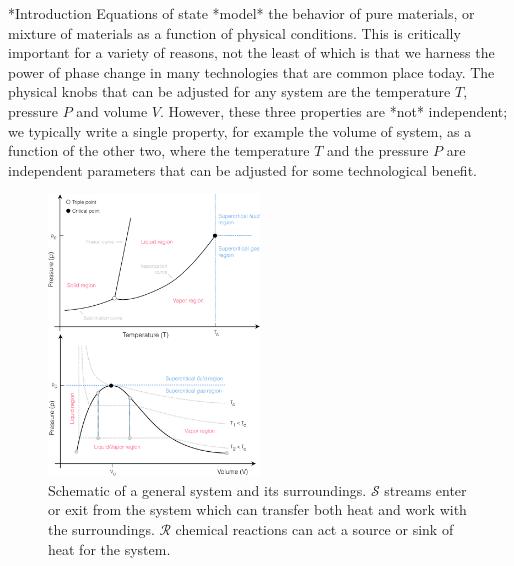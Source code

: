 \documentclass[11pt]{article}
\makeatletter
\theoremstyle{definition}
\renewcommand\subsection{\@startsection
	{subsection}{2}{0mm}
	{-0.05in}
	{0.5\baselineskip}
	{\normalfont\normalsize\bfseries}}
\makeatother
\begin{document}
\subsection*{Introduction}
Equations of state *model* the behavior of pure materials, or mixture of materials as a function of physical conditions.
This is critically important for a variety of reasons, not the least of which is that we harness the power of phase change in many technologies
that are common place today. The physical knobs that can be adjusted for any system are the temperature $T$, pressure $P$ and volume $V$.
However, these three properties are *not* independent;
we typically write a single property, for example the volume of system, as a function of the other two, where the
temperature $T$ and the pressure $P$ are independent parameters that can be adjusted for some technological benefit.

\begin{figure}\center
\includegraphics[width=0.50\textwidth]{./figs/PVT-Diagram.pdf}
\caption{Schematic of a general system and its surroundings.
$\mathcal{S}$ streams enter or exit from the system which can transfer both heat and work with the surroundings.
$\mathcal{R}$ chemical reactions can act a source or sink of heat for the system.}\label{fig-energy-schematic}
\end{figure}
\end{document}
